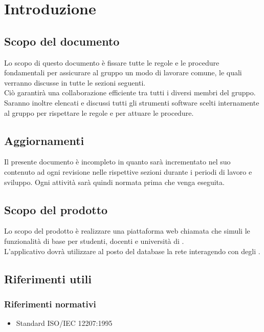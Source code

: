 \documentclass[NormeDiProgetto.tex]{subfiles}
\begin{document}
\chapter{Introduzione}

\section{Scopo del documento}
Lo scopo di questo documento è fissare tutte le regole e le procedure fondamentali per assicurare al gruppo un modo di lavorare comune, le quali verranno discusse in tutte le sezioni seguenti.\\
Ciò garantirà una collaborazione efficiente tra tutti i diversi membri del gruppo.\\
Saranno inoltre elencati e discussi tutti gli strumenti software scelti internamente al gruppo per rispettare le regole e per attuare le procedure.

\section{Aggiornamenti}
Il presente documento è incompleto in quanto sarà incrementato nel suo contenuto ad ogni revisione nelle rispettive sezioni durante i periodi di lavoro e sviluppo. Ogni attività sarà quindi normata prima che venga eseguita.

\section{Scopo del prodotto}
Lo scopo del prodotto è realizzare una piattaforma web chiamata \progetto che simuli le funzionalità di base per studenti, docenti e università di .\\
L'applicativo dovrà utilizzare al posto del database la rete  interagendo con degli .

\glossExpl

\section{Riferimenti utili}
\subsection{Riferimenti normativi}
\begin{itemize}
	\item Standard ISO/IEC 12207:1995\\ 
\end{itemize}
\end{document}

